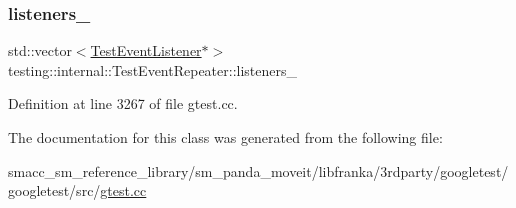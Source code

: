 \subsubsection{\texorpdfstring{listeners\+\_\+}{listeners\_}}
{\footnotesize\ttfamily std\+::vector$<$\hyperlink{classtesting_1_1TestEventListener}{Test\+Event\+Listener}$\ast$$>$ testing\+::internal\+::\+Test\+Event\+Repeater\+::listeners\+\_\+\hspace{0.3cm}{\ttfamily [private]}}



Definition at line 3267 of file gtest.\+cc.



The documentation for this class was generated from the following file\+:\begin{DoxyCompactItemize}
\item 
smacc\+\_\+sm\+\_\+reference\+\_\+library/sm\+\_\+panda\+\_\+moveit/libfranka/3rdparty/googletest/googletest/src/\hyperlink{gtest_8cc}{gtest.\+cc}\end{DoxyCompactItemize}
